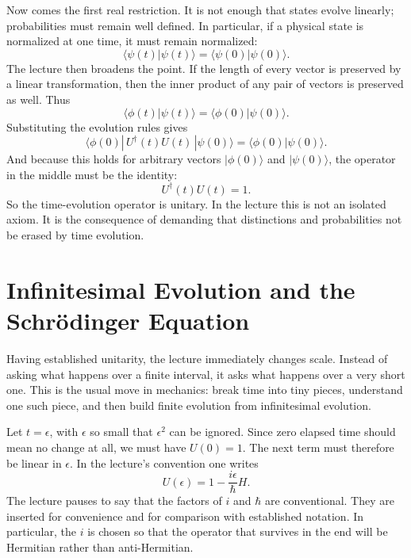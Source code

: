 Now comes the first real restriction. It is not enough that states evolve linearly; probabilities must remain well defined. In particular, if a physical state is normalized at one time, it must remain normalized:
\begin{equation}
\langle \psi(t)|\psi(t)\rangle = \langle \psi(0)|\psi(0)\rangle.
\end{equation}
The lecture then broadens the point. If the length of every vector is preserved by a linear transformation, then the inner product of any pair of vectors is preserved as well. Thus
\begin{equation}
\langle \phi(t)|\psi(t)\rangle = \langle \phi(0)|\psi(0)\rangle.
\end{equation}
Substituting the evolution rules gives
\begin{equation}
\langle \phi(0)|\,U^\dagger(t)U(t)\,|\psi(0)\rangle
=
\langle \phi(0)|\psi(0)\rangle.
\end{equation}
And because this holds for arbitrary vectors \(|\phi(0)\rangle\) and \(|\psi(0)\rangle\), the operator in the middle must be the identity:
\begin{equation}
U^\dagger(t)U(t)=1.
\end{equation}
So the time-evolution operator is unitary. In the lecture this is not an isolated axiom. It is the consequence of demanding that distinctions and probabilities not be erased by time evolution.

\section{Infinitesimal Evolution and the Schrödinger Equation}

Having established unitarity, the lecture immediately changes scale. Instead of asking what happens over a finite interval, it asks what happens over a very short one. This is the usual move in mechanics: break time into tiny pieces, understand one such piece, and then build finite evolution from infinitesimal evolution.

Let \(t=\epsilon\), with \(\epsilon\) so small that \(\epsilon^2\) can be ignored. Since zero elapsed time should mean no change at all, we must have \(U(0)=1\). The next term must therefore be linear in \(\epsilon\). In the lecture's convention one writes
\begin{equation}
U(\epsilon)=1-\frac{i\epsilon}{\hbar}H.
\end{equation}
The lecture pauses to say that the factors of \(i\) and \(\hbar\) are conventional. They are inserted for convenience and for comparison with established notation. In particular, the \(i\) is chosen so that the operator that survives in the end will be Hermitian rather than anti-Hermitian.

